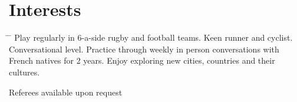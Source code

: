 \documentclass[10pt]{article} %
\begin{document}
\vspace{-5mm}
\section{Interests}

\begin{tabbing}
  \hspace{2mm} \= \hspace{18mm} \= \kill 
     {Play regularly in 6-a-side rugby and football teams. Keen runner and cyclist.}
     {Conversational level. Practice through weekly in person conversations with French natives for 2 years.}
     {Enjoy exploring new cities, countries and their cultures.}
\end{tabbing}

\vspace{-4mm}
Referees available upon request
\end{document}
